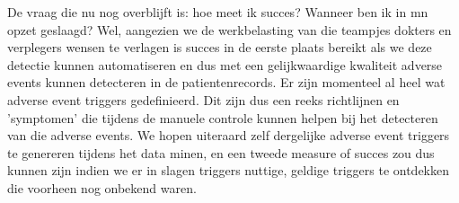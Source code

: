 De vraag die nu nog overblijft is: hoe meet ik succes? Wanneer ben ik in mn opzet geslaagd?
Wel, aangezien we de werkbelasting van die teampjes dokters en verplegers wensen te verlagen is succes in de eerste plaats bereikt als we deze detectie kunnen automatiseren en dus met een gelijkwaardige kwaliteit adverse events kunnen detecteren in de patientenrecords. Er zijn momenteel al heel wat adverse event triggers gedefinieerd. Dit zijn dus een reeks richtlijnen en 'symptomen' die tijdens de manuele controle kunnen helpen bij het detecteren van die adverse events. We hopen uiteraard zelf dergelijke adverse event triggers te genereren tijdens het data minen, en een tweede measure of succes zou dus kunnen zijn indien we er in slagen triggers nuttige, geldige triggers te ontdekken die voorheen nog onbekend waren.
